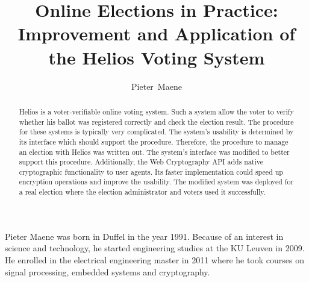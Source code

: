 \documentclass[a4paper,journal]{IEEEtran}
\begin{document}
  
  

  \title{Online Elections in Practice: Improvement and Application of the Helios Voting System}
  \author{Pieter~Maene}

  \maketitle
  
  \begin{abstract}    
    Helios is a voter-verifiable online voting system. Such a system allow the voter to verify whether his ballot was registered correctly and check the election result. The procedure for these systems is typically very complicated. The system's usability is determined by its interface which should support the procedure. Therefore, the procedure to manage an election with Helios was written out. The system's interface was modified to better support this procedure. Additionally, the Web Cryptography API adds native cryptographic functionality to user agents. Its faster implementation could speed up encryption operations and improve the usability. The modified system was deployed for a real election where the election administrator and voters used it successfully.
  \end{abstract}
  
  
  
  
  
  
  
  
  
  

  \begin{IEEEbiography}{Pieter Maene} was born in Duffel in the year 1991. Because of an interest in science and technology, he started engineering studies at the KU Leuven in 2009. He enrolled in the electrical engineering master in 2011 where he took courses on signal processing, embedded systems and cryptography.
  \end{IEEEbiography}
\end{document}
